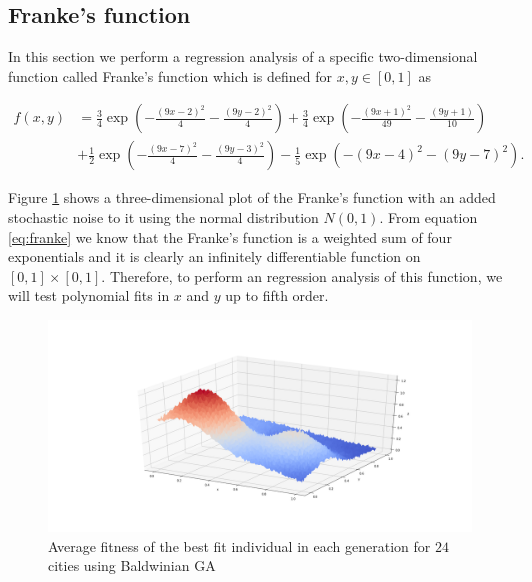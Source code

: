\documentclass [11pt]{article}
\begin{document}
\subsection{Franke's function}
In this section we perform a regression analysis of a specific two-dimensional function called Franke's
function which is defined for $x,y\in [0,1]$ as

\begin{align}
f(x,y) &= \frac{3}{4}\exp{\left(-\frac{(9x-2)^2}{4} - \frac{(9y-2)^2}{4}\right)}+\frac{3}{4}\exp{\left(-\frac{(9x+1)^2}{49}- \frac{(9y+1)}{10}\right)} \\
&+\frac{1}{2}\exp{\left(-\frac{(9x-7)^2}{4} - \frac{(9y-3)^2}{4}\right)} -\frac{1}{5}\exp{\left(-(9x-4)^2 - (9y-7)^2\right) }.
\label{eq:franke}
\end{align}

Figure \ref{fig:Franke} shows a three-dimensional plot of the Franke's function with an added stochastic noise to it using  the normal distribution $N(0,1)$. From equation \eqref{eq:franke} we know that the Franke's function is a weighted sum of four exponentials and it is clearly an infinitely differentiable function on $[0,1] \times [0,1]$. Therefore, to perform an regression analysis of this function, we will test
polynomial fits in $x$ and $y$ up to fifth order.
\begin{figure}[H]
\centering
\includegraphics[width=1\textwidth]{figures/Franke.png}
        \caption{Average fitness of the best fit individual in each generation for $24$ cities using Baldwinian GA}
        \label{fig:Franke}
\end{figure}
\end{document}
